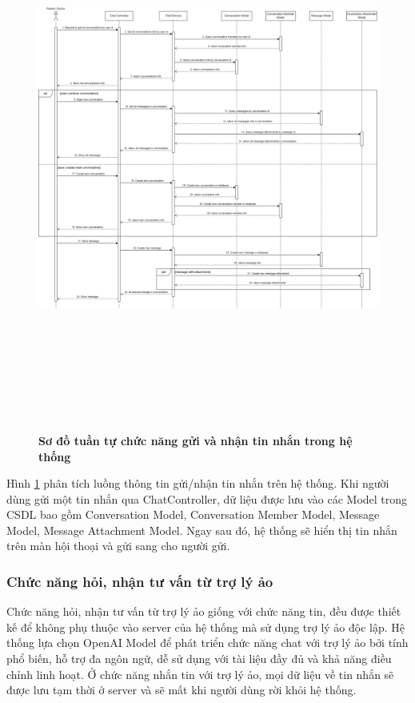 \begin{figure}[H]
  \centering
  \includegraphics[width=16cm,height=18cm]{Images/sequence_api/sendGetMessage.png}
  \caption[Sơ đồ tuần tự chức năng gửi và nhận tin nhắn trong hệ thống]{\bfseries \fontsize{12pt}{0pt}
  \selectfont Sơ đồ tuần tự chức năng gửi và nhận tin nhắn trong hệ thống}
  \label{api_sendMessage} %
\end{figure}
Hình \ref{api_sendMessage} phân tích luồng thông tin gửi/nhận tin nhắn trên hệ thống. Khi người dùng gửi một tin nhắn qua ChatController, dữ liệu được lưu vào các Model trong CSDL bao gồm Conversation Model, 
Conversation Member Model, Message Model, Message Attachment Model. Ngay sau đó, hệ thống sẽ hiển thị tin nhắn trên màn hội thoại và gửi sang cho người gửi. 
\subsubsection{Chức năng hỏi, nhận tư vấn từ trợ lý ảo}
Chức năng hỏi, nhận tư vấn từ trợ lý ảo giống với chức năng tin, đều được thiết kế để không phụ thuộc vào server của
hệ thống mà sử dụng trợ lý ảo độc lập. Hệ thống lựa chọn OpenAI Model để phát triển
chức năng chat với trợ lý ảo bởi tính phổ biến, hỗ trợ đa ngôn ngữ, dễ sử dụng với tài liệu đầy
đủ và khả năng điều chỉnh linh hoạt. Ở chức năng nhắn tin với trợ lý ảo, mọi dữ liệu về tin nhắn sẽ được lưu tạm thời ở 
server và sẽ mất khi người dùng rời khỏi hệ thống.


